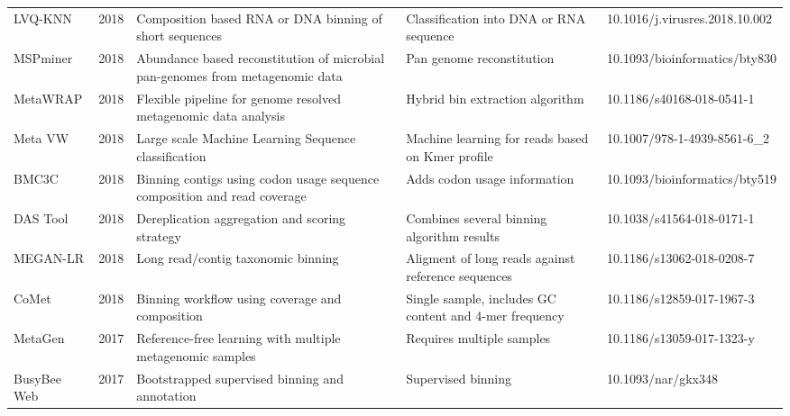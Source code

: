 \begin{tabular}{p{2cm}|p{0.6cm}|p{4cm}|p{4cm}|p{3.4cm}}
           LVQ-KNN &  2018 &                                    Composition based RNA or DNA binning of short sequences &                                          Classification into DNA or RNA sequence &  10.1016/j.virusres.2018.10.002 \\
          MSPminer &  2018 &              Abundance based reconstitution of microbial pan-genomes from metagenomic data &                                                        Pan genome reconstitution &   10.1093/bioinformatics/bty830 \\
          MetaWRAP &  2018 &                            Flexible pipeline for genome resolved metagenomic data analysis &                                                  Hybrid bin extraction algorithm &       10.1186/s40168-018-0541-1 \\
           Meta VW &  2018 &                                       Large scale Machine Learning Sequence classification &                                 Machine learning for reads based on Kmer profile &     10.1007/978-1-4939-8561-6\_2 \\
             BMC3C &  2018 &                   Binning contigs using codon usage sequence composition and read coverage &                                                     Adds codon usage information &   10.1093/bioinformatics/bty519 \\
          DAS Tool &  2018 &                                             Dereplication aggregation and scoring strategy &                                       Combines several binning algorithm results &       10.1038/s41564-018-0171-1 \\
          MEGAN-LR &  2018 &                                                        Long read/contig taxonomic binning  &                               Aligment of long reads against reference sequences &       10.1186/s13062-018-0208-7 \\
             CoMet &  2018 &                                            Binning workflow using coverage and composition &                           Single sample, includes GC content and 4-mer frequency &       10.1186/s12859-017-1967-3 \\
           MetaGen &  2017 &                                  Reference-free learning with multiple metagenomic samples &                                                        Requires multiple samples &       10.1186/s13059-017-1323-y \\
       BusyBee Web &  2017 &                                             Bootstrapped supervised binning and annotation &                                                               Supervised binning &              10.1093/nar/gkx348 \\

\end{tabular}
